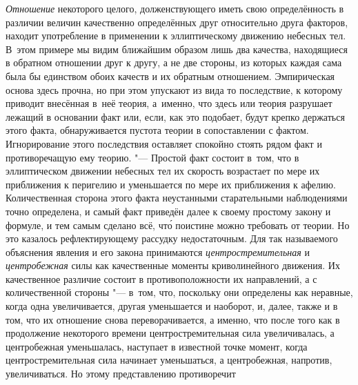 {\em Отношение} некоторого целого, долженствующего иметь свою определённость в
различии величин качественно определённых друг относительно друга факторов,
находит употребление в применении к эллиптическому движению небесных тел.
В~этом примере мы видим ближайшим образом лишь два качества, находящиеся в
обратном отношении друг к другу, а не две стороны, из которых каждая сама была
бы единством обоих качеств и их обратным отношением. Эмпирическая основа здесь
прочна, но при этом упускают из вида то последствие, к которому приводит
внесённая в~неё теория, а~именно, что здесь или теория разрушает лежащий в
основании факт или, если, как это подобает, будут крепко держаться этого факта,
обнаруживается пустота теории в сопоставлении с фактом. Игнорирование этого
последствия оставляет спокойно стоять рядом факт и противоречащую ему теорию.
"--- Простой факт состоит в~том, что в эллиптическом движении небесных тел их
скорость возрастает по мере их приближения к перигелию и уменьшается по мере их
приближения к афелию. Количественная сторона этого факта неустанными
старательными наблюдениями точно определена, и самый факт приведён далее к
своему простому закону и формуле, и тем самым сделано всё, чт\'{о} поистине
можно требовать от теории. Но это казалось рефлектирующему рассудку
недостаточным. Для так называемого объяснения явления и его закона принимаются
{\em центростремительная} и {\em центробежная} силы как качественные моменты
криволинейного движения. Их качественное различие состоит в противоположности
их направлений, а с количественной стороны "--- в~том, что, поскольку они
определены как неравные, когда одна увеличивается, другая уменьшается и
наоборот, и, далее, также и в том, что их отношение снова переворачивается, а
именно, что после того как в продолжение некоторого времени центростремительная
сила увеличивалась, а центробежная уменьшалась, наступает в известной точке
момент, когда центростремительная сила начинает уменьшаться, а центробежная,
напротив, увеличиваться. Но этому представлению противоречит
